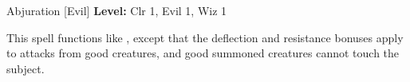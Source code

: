 {Abjuration [Evil]}
{
	\textbf{Level:}
	Clr 1, Evil 1, Wiz 1\\
}
{
	This spell functions like , except that the deflection and resistance bonuses apply to attacks from good creatures, and good summoned creatures cannot touch the subject.

}
